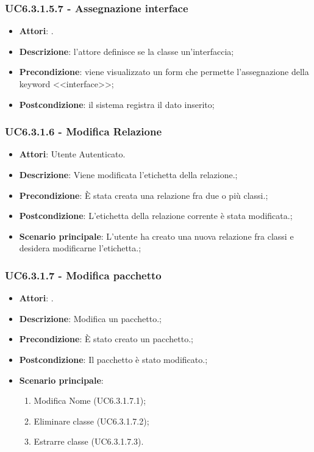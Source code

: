 \subsubsection{UC6.3.1.5.7 - Assegnazione interface} 
\label{sssec:UC6.3.1.5.7} 
\begin{itemize} 
\item \textbf{Attori}: .
\item \textbf{Descrizione}: l'attore definisce se la classe un'interfaccia;
\item \textbf{Precondizione}: viene visualizzato un form che permette l'assegnazione della keyword <<interface>>;
\item \textbf{Postcondizione}: il sistema registra il dato inserito;
\end{itemize} 
\subsubsection{UC6.3.1.6 - Modifica Relazione} 
\label{sssec:UC6.3.1.6} 
\begin{itemize} 
\item \textbf{Attori}: Utente Autenticato.
\item \textbf{Descrizione}: Viene modificata l'etichetta della relazione.;
\item \textbf{Precondizione}: È stata creata una relazione fra due o più classi.;
\item \textbf{Postcondizione}: L'etichetta della relazione corrente è stata modificata.;
\item \textbf{Scenario principale}: L'utente ha creato una nuova relazione fra classi e desidera modificarne l'etichetta.;\end{itemize} 
\subsubsection{UC6.3.1.7 - Modifica pacchetto} 
\label{sssec:UC6.3.1.7} 
\begin{itemize} 
\item \textbf{Attori}: .
\item \textbf{Descrizione}: Modifica un pacchetto.;
\item \textbf{Precondizione}: È stato creato un pacchetto.;
\item \textbf{Postcondizione}: Il pacchetto è stato modificato.;
\item \textbf{Scenario principale}: \begin{enumerate}\item Modifica Nome (UC6.3.1.7.1);\item Eliminare classe (UC6.3.1.7.2);\item Estrarre classe (UC6.3.1.7.3). 
 \end{enumerate}
\end{itemize} 
